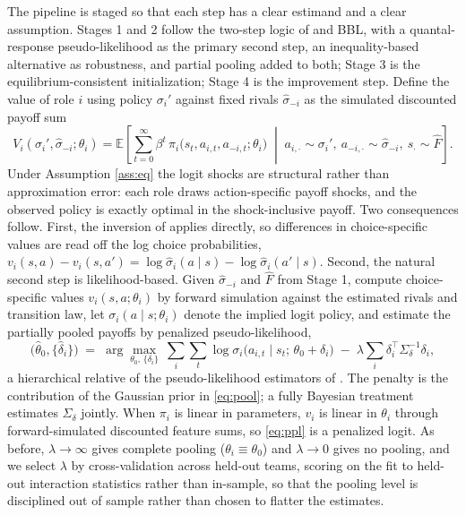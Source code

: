 \documentclass[11pt]{article}
\theoremstyle{definition}
\begin{document}
The pipeline is staged so that each step has a clear estimand and a clear assumption. Stages 1 and 2 follow the two-step logic of \citet{hotzMiller1993} and BBL, with a quantal-response pseudo-likelihood as the primary second step, an inequality-based alternative as robustness, and partial pooling added to both; Stage 3 is the equilibrium-consistent initialization; Stage 4 is the improvement step. Define the value of role $i$ using policy $\sigma_i'$ against fixed rivals $\hat\sigma_{-i}$ as the simulated discounted payoff sum
\begin{equation}
V_i(\sigma_i',\hat\sigma_{-i};\theta_i)
=
\mathbb{E}\!\left[\sum_{t=0}^{\infty}\beta^{t}\,\pi_i\big(s_t,a_{i,t},a_{-i,t};\theta_i\big)
\;\middle|\;
a_{i,\cdot}\sim\sigma_i',\ a_{-i,\cdot}\sim\hat\sigma_{-i},\ s_{\cdot}\sim\hat F\right].
\label{eq:value}
\end{equation}
Under Assumption \ref{ass:eq} the logit shocks are structural rather than approximation error: each role draws action-specific payoff shocks, and the observed policy is exactly optimal in the shock-inclusive payoff. Two consequences follow. First, the inversion of \citet{hotzMiller1993} applies directly, so differences in choice-specific values are read off the log choice probabilities, $v_i(s,a)-v_i(s,a') = \log\hat\sigma_i(a\mid s)-\log\hat\sigma_i(a'\mid s)$. Second, the natural second step is likelihood-based. Given $\hat\sigma_{-i}$ and $\hat F$ from Stage 1, compute choice-specific values $v_i(s,a;\theta_i)$ by forward simulation against the estimated rivals and transition law, let $\sigma_i(a\mid s;\theta_i)$ denote the implied logit policy, and estimate the partially pooled payoffs by penalized pseudo-likelihood,
\begin{equation}
\big(\widehat\theta_0,\{\widehat\delta_i\}\big)
\;=\;
\arg\max_{\theta_0,\,\{\delta_i\}}\
\sum_{i}\sum_{t} \log \sigma_i\big(a_{i,t}\mid s_t;\,\theta_0+\delta_i\big)
\;-\;
\lambda \sum_i \delta_i^{\top}\Sigma_\delta^{-1}\delta_i,
\label{eq:ppl}
\end{equation}
a hierarchical relative of the pseudo-likelihood estimators of \citet{aguirregabiriaMira2007}. The penalty is the contribution of the Gaussian prior in \eqref{eq:pool}; a fully Bayesian treatment estimates $\Sigma_\delta$ jointly. When $\pi_i$ is linear in parameters, $v_i$ is linear in $\theta_i$ through forward-simulated discounted feature sums, so \eqref{eq:ppl} is a penalized logit. As before, $\lambda\!\to\!\infty$ gives complete pooling ($\theta_i \equiv \theta_0$) and $\lambda\!\to\!0$ gives no pooling, and we select $\lambda$ by cross-validation across held-out teams, scoring on the fit to held-out interaction statistics rather than in-sample, so that the pooling level is disciplined out of sample rather than chosen to flatter the estimates.
\end{document}
